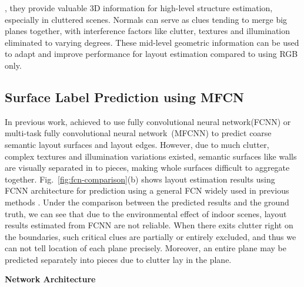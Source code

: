 , they provide valuable 3D information for high-level structure estimation, especially in cluttered scenes.
%
Normals can serve as clues tending to merge big planes together, with interference factors like clutter, textures and illumination eliminated to varying degrees. 
%
These mid-level geometric information can be used to adapt and improve performance for layout estimation compared to using RGB only. 



\subsection{Surface Label Prediction using MFCN}
\label{sec:surfacelabel}
%
In previous work, \cite{dasgupta2016delay,ren2016coarse} achieved to use fully convolutional neural network(FCNN) or multi-task fully convolutional neural network~(MFCNN) to predict coarse semantic layout surfaces and layout edges. 
%
However, due to much clutter, complex textures and illumination variations existed, semantic surfaces like walls are visually separated in to pieces, making whole surfaces difficult to aggregate together. 
%
Fig.~\ref{fig:fcn-comparison}(b) shows layout estimation results using FCNN architecture for prediction using a general FCN widely used in previous methods \cite{dasgupta2016delay,ren2016coarse}. 
Under the comparison between the predicted results and the ground truth, we can see that due to the environmental effect of indoor scenes, layout results estimated from FCNN are not reliable. 
When there exits clutter right on the boundaries, such critical clues are partially or entirely excluded, and thus we can not tell location of each plane precisely. 
Moreover, an entire plane may be predicted separately into pieces due to clutter lay in the plane.

\textbf{Network Architecture}

